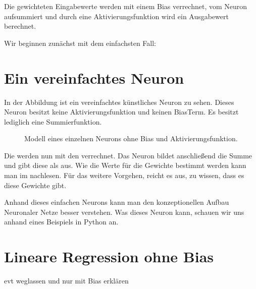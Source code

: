 \documentclass[letterpaper,10pt,english]{jupyterBook}
\let\sphinxpxdimen\pdfpxdimen\else\newdimen\sphinxpxdimen
\begin{document}
\sphinxAtStartPar
Die gewichteten Eingabewerte werden mit einem Bias verrechnet, vom Neuron aufsummiert und durch eine Aktivierungsfunktion wird ein Ausgabewert berechnet.

\sphinxAtStartPar
Wir beginnen zunächst mit dem einfachsten Fall:


\chapter{Ein vereinfachtes Neuron}
\label{\detokenize{02_NN/einzelnes_neuron:ein-vereinfachtes-neuron}}
\sphinxAtStartPar
In der Abbildung ist ein vereinfachtes künstliches Neuron zu sehen. Dieses Neuron besitzt keine Aktivierungsfunktion und keinen Bias\sphinxhyphen{}Term. Es besitzt lediglich eine Summierfunktion.

\begin{figure}[htbp]
\centering
\capstart

\noindent\sphinxincludegraphics[width=900\sphinxpxdimen]{{neuron_summe}.png}
\caption{Modell eines einzelnen Neurons ohne Bias und Aktivierungsfunktion.}\label{\detokenize{02_NN/einzelnes_neuron:id1}}\end{figure}

\sphinxAtStartPar
Die  werden nun mit den  verrechnet. Das Neuron bildet anschließend die Summe und gibt diese als  aus. Wie die Werte für die Gewichte bestimmt werden kann man im  nachlesen. Für das weitere Vorgehen, reicht es aus, zu wissen, dass es diese Gewichte gibt.

\sphinxAtStartPar
Anhand dieses einfachen Neurons kann man den konzeptionellen Aufbau Neuronaler Netze besser verstehen. Was dieses Neuron kann, schauen wir uns anhand eines Beispiels in Python an.


\chapter{Lineare Regression ohne Bias}
\label{\detokenize{02_NN/einzelnes_neuron:lineare-regression-ohne-bias}}
\sphinxAtStartPar
evt weglassen und nur mit Bias erklären

\sphinxAtStartPar
{}

\sphinxAtStartPar
{}
\end{document}
